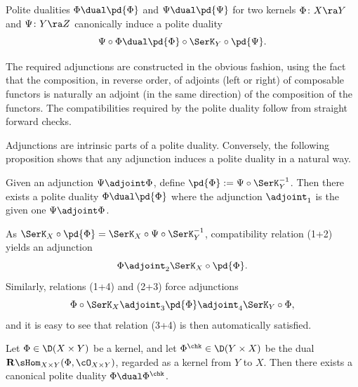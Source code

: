 \begin{Proposition}
\label{prop:compduals}
  Polite dualities $\Phi \dual \pd{\Phi}$ and $\Psi \dual \pd{\Psi}$ for
  two kernels $\Phi\colon X\ra Y$ and $\Psi\colon Y\ra Z$ canonically
  induce a polite duality
  \[ \Psi \circ \Phi \dual \pd{\Phi} \circ \SerK_Y \circ \pd{\Psi}. \]
\end{Proposition}

\begin{Proof}
  The required adjunctions are constructed in the obvious fashion,
  using the fact that the composition, in reverse order, of adjoints
  (left or right) of composable functors is naturally an adjoint (in
  the same direction) of the composition of the functors.  The
  compatibilities required by the polite duality follow from straight
  forward checks.
\end{Proof}

Adjunctions are intrinsic parts of a polite duality.  Conversely, the
following proposition shows that any adjunction induces a polite
duality in a natural way.

\begin{Proposition}
\label{prop:adjgivesdual}
Given an adjunction $\Psi \adjoint \Phi$, define $\pd{\Phi}:= \Psi \circ
\SerK_Y^{-1}$.  Then there exists a polite duality $\Phi \dual
\pd{\Phi}$ where the adjunction $\adjoint_1$ is the given one
$\Psi\adjoint \Phi$.
\end{Proposition}

\begin{Proof}
  As $\SerK_X\circ \pd{\Phi}= \SerK_X\circ\Psi\circ\SerK^{-1}_Y$, compatibility relation (1+2) yields an adjunction
  \[ \Phi \adjoint_2 \SerK_X
  \circ \pd{\Phi}. \] Similarly, relations (1+4) and (2+3) force
  adjunctions
  \[ \Phi \circ \SerK_X \adjoint_3 \pd{\Phi} \adjoint_4 \SerK_Y \circ
  \Phi, \]
  and it is easy to see that relation (3+4) is then automatically
  satisfied.
\end{Proof}

\begin{Proposition}
\label{prop:existdual}
Let $\Phi\in\D(X\times Y)$ be a kernel, and let
$\Phi^\chk\in\D(Y\times X)$ be the dual $\mathbf{R}\sHom_{X\times
  Y}(\Phi, \cO_{X\times Y})$, regarded as a kernel from $Y$ to $X$.
Then there exists a canonical polite duality \(\Phi \dual \Phi^\chk\).
\end{Proposition}

